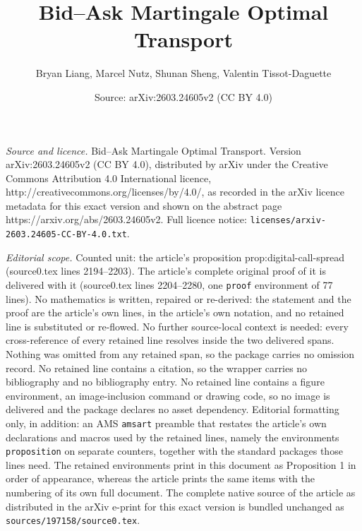 \documentclass[10pt,a4paper]{amsart}
\title{Bid--Ask Martingale Optimal Transport}
\author{Bryan Liang, Marcel Nutz, Shunan Sheng, Valentin Tissot-Daguette}
\date{Source: arXiv:2603.24605v2 (CC BY 4.0)}
\begin{document}
\maketitle

\noindent\emph{Source and licence.} Bid--Ask Martingale Optimal Transport. Version arXiv:2603.24605v2 (CC BY 4.0), distributed by arXiv under the Creative Commons Attribution 4.0 International licence, http://creativecommons.org/licenses/by/4.0/, as recorded in the arXiv licence metadata for this exact version and shown on the abstract page https://arxiv.org/abs/2603.24605v2. Full licence notice: \texttt{licenses/arxiv-2603.24605-CC-BY-4.0.txt}.\par\smallskip

\noindent\textit{Editorial scope.} Counted unit: the article's proposition prop:digital-call-spread (source0.tex lines 2194--2203). The article's complete original proof of it is delivered with it (source0.tex lines 2204--2280, one \texttt{proof} environment of 77 lines). No mathematics is written, repaired or re-derived: the statement and the proof are the article's own lines, in the article's own notation, and no retained line is substituted or re-flowed.  No further source-local context is needed: every cross-reference of every retained line resolves inside the two delivered spans.  Nothing was omitted from any retained span, so the package carries no omission record.  No retained line contains a citation, so the wrapper carries no bibliography and no bibliography entry.  No retained line contains a figure environment, an image-inclusion command or drawing code, so no image is delivered and the package declares no asset dependency.  Editorial formatting only, in addition: an AMS \texttt{amsart} preamble that restates the article's own declarations and macros used by the retained lines, namely the environments \texttt{proposition} on separate counters, together with the standard packages those lines need.  The retained environments print in this document as Proposition 1 in order of appearance, whereas the article prints the same items with the numbering of its own full document.  The complete native source of the article as distributed in the arXiv e-print for this exact version is bundled unchanged as \texttt{sources/197158/source0.tex}.
\end{document}

